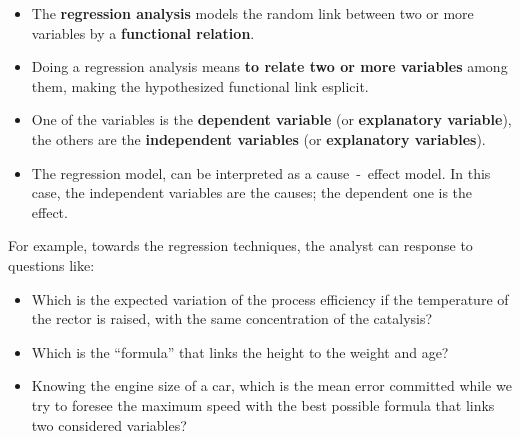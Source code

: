 

\begin{frame}
  \vspace*{.35cm}
  \begin{itemize}
    \item The \textbf{regression analysis} models the random link between two or more variables by a \textbf{functional relation}.
    \vspace*{.7cm}
    \item Doing a regression analysis means \textbf{to relate two or more variables} among them, making the hypothesized functional link esplicit.
    \vspace*{.7cm}
    \item One of the variables is the \textbf{dependent variable} (or \textbf{explanatory variable}), the others are the \textbf{independent variables} (or \textbf{explanatory variables}). 
    \vspace*{.7cm}
    \item The regression model, can be interpreted as a cause~-~effect model. In this case, the independent variables are the causes; the dependent one is the effect.
  \end{itemize}
\end{frame}

\begin{frame}
  For example, towards the regression techniques, the analyst can response to questions like:
  \vspace{.5cm}
  \begin{itemize}
    \item Which is the expected variation of the process efficiency if the temperature of the rector is raised, with the same concentration of the catalysis?
    \vspace{.5cm}
    \item Which is the ``formula'' that links the height to the weight and age?
    \vspace{.5cm}
    \item Knowing the engine size of a car, which is the mean error committed while we try to foresee the maximum speed with the best possible formula that links two considered variables?
  \end{itemize}
\end{frame}

